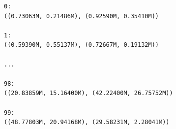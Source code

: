 \vspace{5mm} %

\begin{lstlisting}[frame=single]
0:
((0.73063M, 0.21486M), (0.92590M, 0.35410M))

1:
((0.59390M, 0.55137M), (0.72667M, 0.19132M))

...

98:
((20.83859M, 15.16400M), (42.22400M, 26.75752M))

99:
((48.77803M, 20.94168M), (29.58231M, 2.28041M))
\end{lstlisting}
